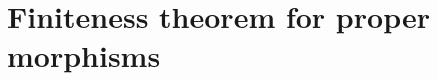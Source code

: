 \section{Finiteness theorem for proper morphisms}
\label{section-finiteness-theorem-for-proper-morphisms}

